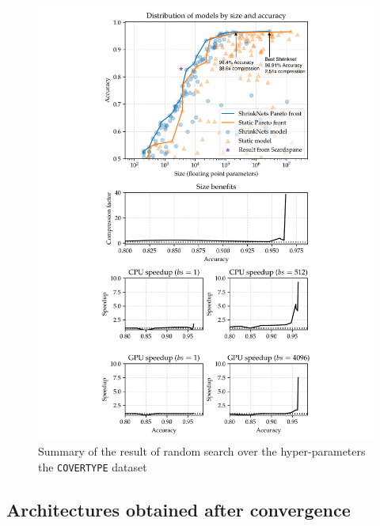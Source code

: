 \begin{figure}[t]
\begin{minipage}{2.7in}
\centering\includegraphics[width=\columnwidth]{COVER_FC_summary-arrows}
\vspace*{-10mm}
\caption{\label{figure_COVER} Summary of the result of random
search over the hyper-parameters the \texttt{COVERTYPE} dataset
}
\vspace*{-5mm}
\end{minipage}
\end{figure}

\subsection{Architectures obtained after convergence}

